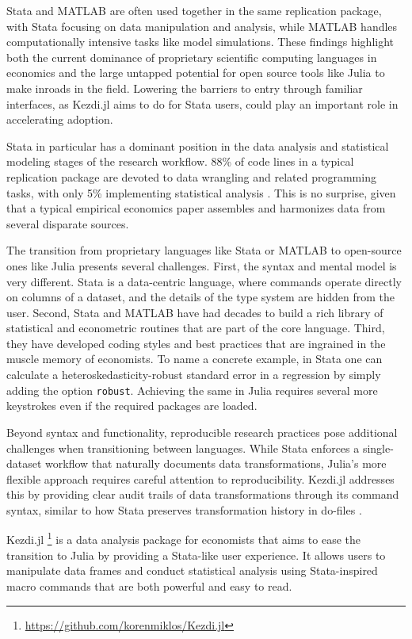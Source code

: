 \documentclass{juliacon}
\begin{document}
Stata and MATLAB are often used together in the same replication package, with Stata focusing on data manipulation and analysis, while MATLAB handles computationally intensive tasks like model simulations. These findings highlight both the current dominance of proprietary scientific computing languages in economics and the large untapped potential for open source tools like Julia to make inroads in the field. Lowering the barriers to entry through familiar interfaces, as Kezdi.jl aims to do for Stata users, could play an important role in accelerating adoption.

Stata in particular has a dominant position in the data analysis and statistical modeling stages of the research workflow. 88\% of code lines in a typical replication package are devoted to data wrangling and related programming tasks, with only 5\% implementing statistical analysis \cite{koren2023share}. This is no surprise, given that a typical empirical economics paper assembles and harmonizes data from several disparate sources.

The transition from proprietary languages like Stata or MATLAB to open-source ones like Julia presents several challenges. First, the syntax and mental model is very different. Stata is a data-centric language, where commands operate directly on columns of a dataset, and the details of the type system are hidden from the user. Second, Stata and MATLAB have had decades to build a rich library of statistical and econometric routines that are part of the core language. Third, they have developed coding styles and best practices that are ingrained in the muscle memory of economists. To name a concrete example, in Stata one can calculate a heteroskedasticity-robust standard error in a regression by simply adding the option \texttt{robust}. Achieving the same in Julia requires several more keystrokes even if the required packages are loaded.

Beyond syntax and functionality, reproducible research practices pose additional challenges when transitioning between languages. While Stata enforces a single-dataset workflow that naturally documents data transformations, Julia's more flexible approach requires careful attention to reproducibility. Kezdi.jl addresses this by providing clear audit trails of data transformations through its command syntax, similar to how Stata preserves transformation history in do-files \cite{koren2024ten}.

Kezdi.jl \footnote{\url{https://github.com/korenmiklos/Kezdi.jl}} is a data analysis package for economists that aims to ease the transition to Julia by providing a Stata-like user experience. It allows users to manipulate data frames and conduct statistical analysis using Stata-inspired macro commands that are both powerful and easy to read.
\end{document}
